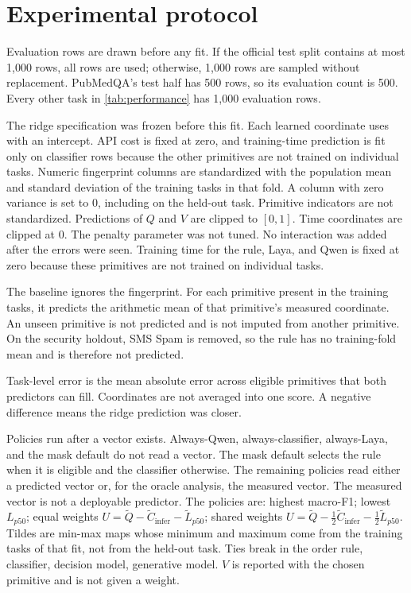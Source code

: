 \section{Experimental protocol}
\label{sec:protocol}

Evaluation rows are drawn before any fit. If the official test split contains at most 1{,}000 rows, all rows are used; otherwise, 1{,}000 rows are sampled without replacement. PubMedQA's test half has 500 rows, so its evaluation count is 500. Every other task in \cref{tab:performance} has 1{,}000 evaluation rows.

The ridge specification was frozen before this fit. Each learned coordinate uses  with an intercept. API cost is fixed at zero, and training-time prediction is fit only on classifier rows because the other primitives are not trained on individual tasks. Numeric fingerprint columns are standardized with the population mean and standard deviation of the training tasks in that fold. A column with zero variance is set to 0, including on the held-out task. Primitive indicators are not standardized. Predictions of \(Q\) and \(V\) are clipped to \([0,1]\). Time coordinates are clipped at 0. The penalty parameter was not tuned. No interaction was added after the errors were seen. Training time for the rule, Laya, and Qwen is fixed at zero because these primitives are not trained on individual tasks.

The baseline ignores the fingerprint. For each primitive present in the training tasks, it predicts the arithmetic mean of that primitive's measured coordinate. An unseen primitive is not predicted and is not imputed from another primitive. On the security holdout, SMS Spam is removed, so the rule has no training-fold mean and is therefore not predicted.

Task-level error is the mean absolute error across eligible primitives that both predictors can fill. Coordinates are not averaged into one score. A negative difference means the ridge prediction was closer.

Policies run after a vector exists. Always-Qwen, always-classifier, always-Laya, and the mask default do not read a vector. The mask default selects the rule when it is eligible and the classifier otherwise. The remaining policies read either a predicted vector or, for the oracle analysis, the measured vector. The measured vector is not a deployable predictor. The policies are: highest macro-F1; lowest \(L_{p50}\); equal weights \(U=\tilde Q-\tilde C_{\mathrm{infer}}-\tilde L_{p50}\); shared weights \(U=\tilde Q-\tfrac12\tilde C_{\mathrm{infer}}-\tfrac12\tilde L_{p50}\). Tildes are min-max maps whose minimum and maximum come from the training tasks of that fit, not from the held-out task. Ties break in the order rule, classifier, decision model, generative model. \(V\) is reported with the chosen primitive and is not given a weight.

